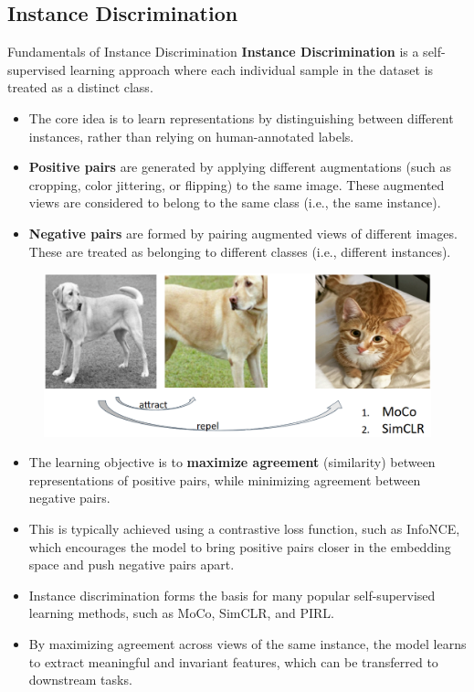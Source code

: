 \subsection{Instance Discrimination}
\begin{frame}[allowframebreaks]{Fundamentals of Instance Discrimination}
    \textbf{Instance Discrimination} is a self-supervised learning approach where each individual sample in the dataset is treated as a distinct class.
    \begin{itemize}
        \item The core idea is to learn representations by distinguishing between different instances, rather than relying on human-annotated labels.
        \item \textbf{Positive pairs} are generated by applying different augmentations (such as cropping, color jittering, or flipping) to the same image. These augmented views are considered to belong to the same class (i.e., the same instance).
        \item \textbf{Negative pairs} are formed by pairing augmented views of different images. These are treated as belonging to different classes (i.e., different instances).
    \end{itemize}

    \framebreak
    \begin{figure}
        \centering
        \includegraphics[width=1\linewidth,height=0.9\textheight,keepaspectratio]{images/ssl/slide_63_img.png}
    \end{figure}

    \framebreak
    \begin{itemize}
        \item The learning objective is to \textbf{maximize agreement} (similarity) between representations of positive pairs, while minimizing agreement between negative pairs.
        \item This is typically achieved using a contrastive loss function, such as InfoNCE, which encourages the model to bring positive pairs closer in the embedding space and push negative pairs apart.
        \item Instance discrimination forms the basis for many popular self-supervised learning methods, such as MoCo, SimCLR, and PIRL.
        \item By maximizing agreement across views of the same instance, the model learns to extract meaningful and invariant features, which can be transferred to downstream tasks.
    \end{itemize}
\end{frame}